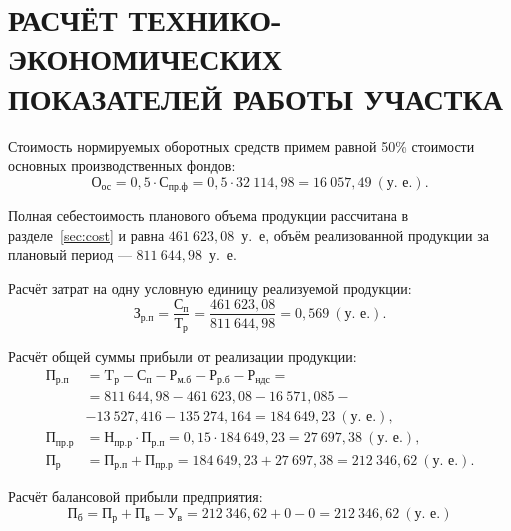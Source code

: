 \section[%
Расчёт технико-экономических показателей работы участка
]{%
РАСЧЁТ ТЕХНИКО-ЭКОНОМИЧЕСКИХ \\
ПОКАЗАТЕЛЕЙ РАБОТЫ УЧАСТКА
}
\label{sec:tep}

Стоимость нормируемых оборотных средств примем равной 50\% стоимости
основных производственных фондов:
\begin{equation*}
  \text{О}_{\text{ос}} = 0{,}5 \cdot \text{С}_{\text{пр.ф}} =
  0{,}5 \cdot 32~114{,}98 = 16~057{,}49~(\text{у.~е.}).
\end{equation*}

Полная себестоимость планового объема продукции рассчитана в
разделе~\ref{sec:cost} и равна $461~623{,}08$~у.~е, объём реализованной
продукции за плановый период --- $811~644{,}98$~у.~е.

Расчёт затрат на одну условную единицу реализуемой продукции:
\begin{equation*}
  \text{З}_{\text{р.п}} = \dfrac{\text{С}_{\text{п}}}{\text{Т}_{\text{р}}} =
  \dfrac{461~623{,}08}{811~644{,}98} = 0{,}569 ~ (\text{у.~е.}).
\end{equation*}

Расчёт общей суммы прибыли от реализации продукции:
\begin{align*}
  \text{П}_{\text{р.п}} &=
  \text{T}_{\text{р}} - \text{С}_{\text{п}} - \text{Р}_{\text{м.б}} -
  \text{Р}_{\text{р.б}} - \text{Р}_{\text{ндс}} = \\
  &= 811~644{,}98 - 461~623{,}08 - 16~571{,}085 - \\
  &- 13~527{,}416 - 135~274{,}164 = 184~649{,}23 ~ (\text{у.~е.}), \\
  \text{П}_{\text{пр.р}} &= \text{Н}_{\text{пр.р}} \cdot \text{П}_{\text{р.п}} =
  0{,}15 \cdot 184~649{,}23 = 27~697{,}38 ~ (\text{у.~е.}), \\
  \text{П}_{\text{р}} &= \text{П}_{\text{р.п}} + \text{П}_{\text{пр.р}} =
  184~649{,}23 + 27~697{,}38 = 212~346{,}62 ~ (\text{у.~е.}).
\end{align*}

Расчёт балансовой прибыли предприятия:
\begin{equation*}
  \text{П}_{\text{б}} = \text{П}_{\text{р}} + \text{П}_{\text{в}} - \text{У}_{\text{в}} =
  212~346{,}62 + 0 - 0 = 212~346{,}62~(\text{у.~е.})
\end{equation*}

